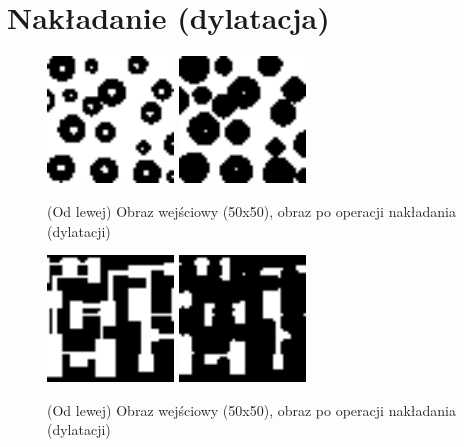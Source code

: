 \documentclass[final,a4paper,openany,12pt]{mwbk}
\begin{document}
\section{ Nakładanie (dylatacja)}

\begin{figure}[H]
	\begin{center}
		\includegraphics[width=0.3\textwidth]{1/1Bin_D_Original}
		\includegraphics[width=0.3\textwidth]{1/1Bin_D_Result}
	\end{center}
	\caption{(Od lewej) Obraz wejściowy (50x50), obraz po operacji nakładania (dylatacji) }
\end{figure}

\begin{figure}[H]
	\begin{center}
		\includegraphics[width=0.3\textwidth]{2/2Bin_D_Original}
		\includegraphics[width=0.3\textwidth]{2/2Bin_D_Result}
	\end{center}
	\caption{(Od lewej) Obraz wejściowy (50x50), obraz po operacji nakładania (dylatacji)}
\end{figure}
\end{document}
